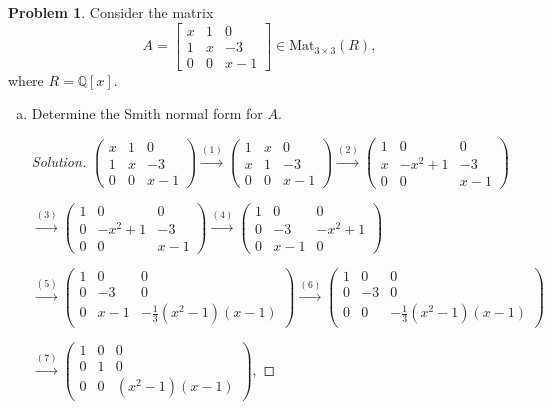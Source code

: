 \documentclass[11pt]{article}
\def\ra{\rightarrow}
\newcommand{\Q}{\mathbb{Q}}
\theoremstyle{definition}
\newtheorem{problem}{Problem}
\begin{document}
\begin{problem}
Consider the matrix 
$$A=\begin{bmatrix}
x & 1 & 0 \\
1 & x & -3 \\
0 & 0 & x-1
\end{bmatrix}
\in \mathrm{Mat}_{3\times 3}(R),$$ 
where $R=\Q[x]$. 
\begin{enumerate}[(a)]
\item Determine the Smith normal form for $A$.





\begin{proof}[Solution]
$
\begin{pmatrix}x&1&0\\1&x&-3\\0&0&x-1\end{pmatrix}
\stackrel{(1)}{\ra}
\begin{pmatrix}1&x&0\\x&1&-3\\0&0&x-1\end{pmatrix}
\stackrel{(2)}{\ra}
\begin{pmatrix}1&0&0\\x&-x^2+1&-3\\0&0&x-1\end{pmatrix}
$

$
\stackrel{(3)}{\ra}
\begin{pmatrix}1&0&0\\0&-x^2+1&-3\\0&0&x-1\end{pmatrix}
\stackrel{(4)}{\ra}
\begin{pmatrix}1&0&0\\0&-3&-x^2+1\\0&x-1&0\end{pmatrix}
$

$
\stackrel{(5)}{\ra}
\begin{pmatrix}1&0&0\\0&-3&0\\0&x-1&-\frac{1}{3}(x^2-1)(x-1)\end{pmatrix}
\stackrel{(6)}{\ra}
\begin{pmatrix}1&0&0\\0&-3&0\\0&0&-\frac{1}{3}(x^2-1)(x-1)\end{pmatrix}$

$\stackrel{(7)}{\ra}
\begin{pmatrix}1&0&0\\0&1&0\\0&0&(x^2-1)(x-1)\end{pmatrix}$,


\end{proof}
\end{enumerate}
\end{problem}
\end{document}
